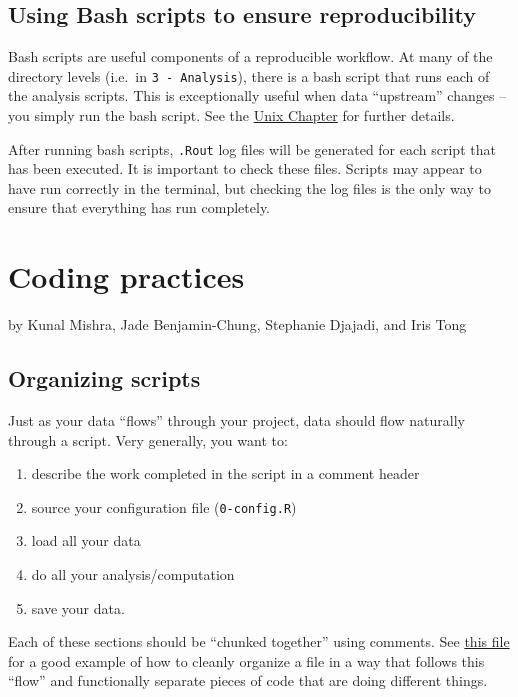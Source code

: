 \documentclass[
]{book}
\providecommand{\tightlist}{%
  \setlength{\itemsep}{0pt}\setlength{\parskip}{0pt}}
\begin{document}
\section{Using Bash scripts to ensure reproducibility}\label{using-bash-scripts-to-ensure-reproducibility}

Bash scripts are useful components of a reproducible workflow. At many of the directory levels (i.e.~in \texttt{3\ -\ Analysis}), there is a bash script that runs each of the analysis scripts. This is exceptionally useful when data ``upstream'' changes -- you simply run the bash script. See the \hyperref[unix]{Unix Chapter} for further details.

After running bash scripts, \texttt{.Rout} log files will be generated for each script that has been executed. It is important to check these files. Scripts may appear to have run correctly in the terminal, but checking the log files is the only way to ensure that everything has run completely.

\chapter{Coding practices}\label{coding-practices}

by Kunal Mishra, Jade Benjamin-Chung, Stephanie Djajadi, and Iris Tong

\section{Organizing scripts}\label{organizing-scripts}

Just as your data ``flows'' through your project, data should flow naturally through a script. Very generally, you want to:

\begin{enumerate}
\def\labelenumi{\arabic{enumi}.}
\tightlist
\item
  describe the work completed in the script in a comment header
\item
  source your configuration file (\texttt{0-config.R})
\item
  load all your data
\item
  do all your analysis/computation
\item
  save your data.
\end{enumerate}

Each of these sections should be ``chunked together'' using comments. See \href{https://github.com/kmishra9/Flu-Absenteeism/blob/master/Master's\%20Thesis\%20-\%20Spatial\%20Epidemiology\%20of\%20Influenza/2a\%20-\%20Statistical-Inputs.R}{this file} for a good example of how to cleanly organize a file in a way that follows this ``flow'' and functionally separate pieces of code that are doing different things.
\end{document}

